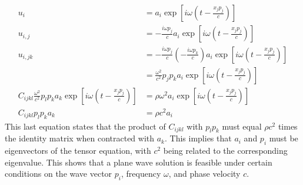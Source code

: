 \documentclass[12pt]{article} %
\begin{document}
\begin{align*}
u_i &= a_i \exp[i \omega (t - \frac{x_j p_j}{c})] \\
u_{i,j} &= -\frac{i \omega p_j}{c} a_i \exp[i \omega (t - \frac{x_j p_j}{c})]\\
u_{i,jk} &= -\frac{i \omega p_j}{c} (-\frac{i \omega p_k}{c}) a_i \exp[i \omega (t - \frac{x_j p_j}{c})] \\
&= \frac{\omega^2}{c^2} p_j p_k a_i \exp[i \omega (t - \frac{x_j p_j}{c})]\\
C_{ijkl} \frac{\omega^2}{c^2} p_l p_k a_k \exp[i \omega (t - \frac{x_j p_j}{c})] &= \rho \omega^2 a_i \exp[i \omega (t - \frac{x_j p_j}{c})]\\
C_{ijkl} p_l p_k a_k &= \rho c^2 a_i
\end{align*}
This last equation states that the product of \(C_{ijkl}\) with \(p_l p_k\) must equal \(\rho c^2\) times the identity matrix when contracted with \(a_k\). This implies that \(a_i\) and \(p_i\) must be eigenvectors of the tensor equation, with \(c^2\) being related to the corresponding eigenvalue. This shows that a plane wave solution is feasible under certain conditions on the wave vector \(p_i\), frequency \(\omega\), and phase velocity \(c\).
\end{document}
